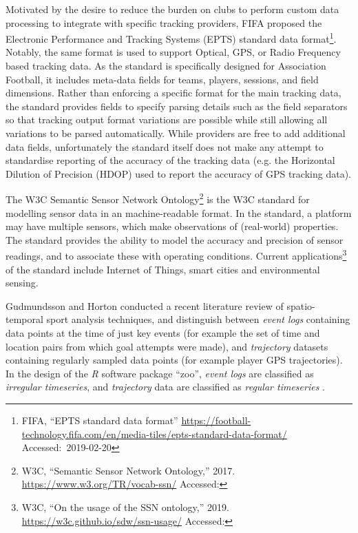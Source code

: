 

Motivated by the desire to reduce the burden on clubs to perform custom data processing to integrate with specific tracking providers, FIFA proposed the Electronic Performance and Tracking Systems (EPTS) standard data format\footnote{FIFA, ``EPTS standard data format'' \url{https://football-technology.fifa.com/en/media-tiles/epts-standard-data-format/} Accessed:~2019-02-20}. Notably, the same format is used to support Optical, GPS, or Radio Frequency based tracking data. As the standard is specifically designed for Association Football, it includes meta-data fields for teams, players, sessions, and field dimensions. Rather than enforcing a specific format for the main tracking data, the standard provides fields to specify parsing details such as the field separators so that tracking output format variations are possible while still allowing all variations to be parsed automatically. While providers are free to add additional data fields, unfortunately the standard itself does not make any attempt to standardise reporting of the accuracy of the tracking data (e.g. the Horizontal Dilution of Precision (HDOP) used to report the accuracy of GPS tracking data).

The W3C Semantic Sensor Network Ontology\footnote{W3C, ``Semantic Sensor Network Ontology,'' 2017. \url{https://www.w3.org/TR/vocab-ssn/} Accessed: } is the W3C standard for modelling sensor data in an machine-readable format. In the standard, a platform may have multiple sensors, which make observations of (real-world) properties. The standard provides the ability to model the accuracy and precision of sensor readings, and to associate these with operating conditions. Current applications\footnote{W3C, ``On the usage of the SSN ontology,'' 2019. \url{https://w3c.github.io/sdw/ssn-usage/} Accessed: } of the standard include Internet of Things, smart cities and environmental sensing.

Gudmundsson and Horton conducted a recent literature review
\cite{Gudmundsson2016} of spatio-temporal sport
analysis techniques, and distinguish between \emph{event logs}
containing data points at the time of just key events (for example the
set of time and location pairs from which goal attempts were made), and
\emph{trajectory} datasets containing regularly sampled data points
(for example player GPS trajectories). In the design of the \textit{R} software
package ``zoo'', \emph{event logs} are classified as \emph{irregular
timeseries}, and \emph{trajectory} data are classified as \emph{regular
timeseries} \cite{Zeileis2005}.

